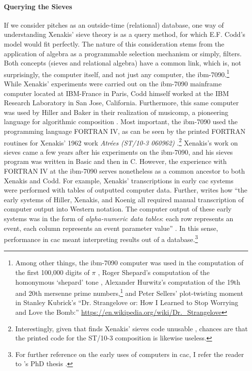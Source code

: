 \paragraph{Querying the Sieves}
If we consider pitches as an outside-time (relational) database, one way of understanding Xenakis' sieve theory is as a query method, for which E.F. Codd's  model would fit perfectly. The nature of this consideration stems from the application of algebra as a programmable selection mechanism or simply, filters. Both concepts (sieves and relational algebra) have a common link, which is, not surprisingly, the computer itself, and not just any computer, the \gls{ibm-7090}.\footnote{Among other things, the \gls{ibm-7090} computer was used in the computation of the first 100,000 digits of $\pi$ \parencite{picalc}, Roger Shepard's computation of the homonymous `shepard' tone \parencite{shepard}, Alexander Hurwitz's computation of the 19th and 20th mersenne prime numbers,\footnote{\url{https://www.mersenne.org/primes/}} and Peter Sellers' plot-twisting moment in Stanley Kubrick's ``Dr. Strangelove or: How I Learned to Stop Worrying and Love the Bomb:'' \url{https://en.wikipedia.org/wiki/Dr._Strangelove}} While Xenakis' experiments were carried out on the \gls{ibm-7090} mainframe computer located at IBM-France in Paris, Codd himself worked at the IBM Research Laboratory in San Jose, California. Furthermore, this same computer was used by Hiller and Baker in their realization of \gls{musicomp}, a pioneering language for algorithmic composition \parencite[44]{Ari05:Ano}. Most important, the \gls{ibm-7090} used the programming language FORTRAN IV, as can be seen by the printed FORTRAN routines for Xenakis' 1962 work \textit{Atrées (ST/10-3 060962)} \parencite[145]{Xen92:For}.\footnote{Interestingly, given that \citeauthor{arizaSieves} finds Xenakis' sieves code unusable \parencite[1]{arizaSieves}, chances are that the printed code for the ST/10-3 composition is likewise useless.} Xenakis's work on sieves came a few years after his experiments on the \gls{ibm-7090}, and his sieves program was written in Basic and then in C. However, the experience with FORTRAN IV at the \gls{ibm-7090} serves nonetheless as a common ancestor to both Xenakis and Codd. For example, Xenakis' transcriptions in early \gls{cac} systems were performed with tables of outputted computer data. Further, \citeauthor{Ari05:Ano} \parencite{Ari05:Ano} writes how ``the early systems of Hiller, Xenakis, and Koenig all required manual transcription of computer output into Western notation. The computer output of these early systems was in the form of \textit{alpha-numeric data tables}: each row represents an event, each column represents an event parameter value'' \im \parencite[94]{Ari05:Ano}. In this sense, performance in \gls{cac} meant interpreting results out of a database.\footnote{For further reference on the early uses of computers in \gls{cac}, I refer the reader to \citeauthor{Ari05:Ano}'s PhD thesis \parencite{Ari05:Ano}.}

